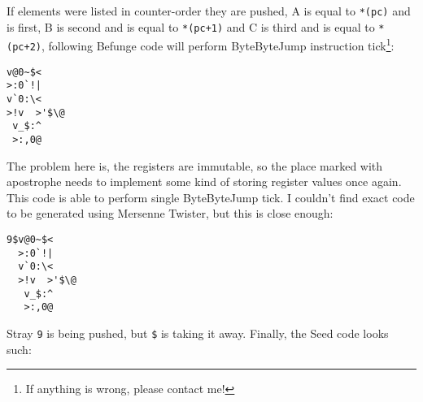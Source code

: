\documentclass{article}
\begin{document}
\par If elements were listed in counter-order they are pushed, A is equal to \verb|*(pc)| and is first, B is second and is equal to \verb|*(pc+1)| and C is third and is equal to \verb|*(pc+2)|, following Befunge code will perform ByteByteJump instruction tick\footnote{If anything is wrong, please contact me!}:

\begin{verbatim}
v@0~$<
>:0`!|
v`0:\<
>!v  >'$\@
 v_$:^
 >:,0@
\end{verbatim}

The problem here is, the registers are immutable, so the place marked with apostrophe needs to implement some kind of storing register values once again. This code is able to perform single ByteByteJump tick. I couldn't find exact code to be generated using Mersenne Twister, but this is close enough:

\begin{verbatim}
9$v@0~$<
  >:0`!|
  v`0:\<
  >!v  >'$\@
   v_$:^
   >:,0@
\end{verbatim}

\par Stray \verb|9| is being pushed, but \verb|$| is taking it away. Finally, the Seed code looks such:
\end{document}
